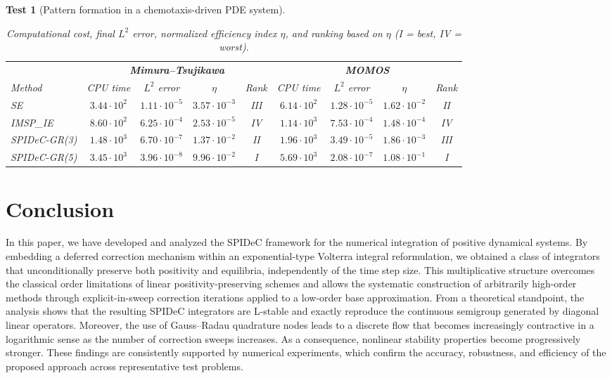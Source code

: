 \documentclass[a4paper,num-refs]{oup-contemporary-spidec}
\newtheorem{testcase}{Test} %
\begin{document}
\begin{testcase}[Pattern formation in a chemotaxis-driven PDE system]
\begin{table}[htb]
\centering
\caption{Computational cost, final $L^2$ error, normalized efficiency index $\eta$, and ranking based on $\eta$ (I = best, IV = worst).}
\label{tab:efficiency_rank}
\scriptsize
\setlength{\tabcolsep}{5pt}
\begin{tabular}{lcccc|cccc}
\toprule
& \multicolumn{4}{c|}{\textbf{Mimura--Tsujikawa}} & \multicolumn{4}{c}{\textbf{MOMOS}} \\
\cmidrule(lr){2-5} \cmidrule(lr){6-9}
Method & CPU time & $L^2$ error & $\eta$ & Rank
        & CPU time & $L^2$ error & $\eta$ & Rank \\
\midrule
SE
& $3.44\cdot10^{2}$ & $1.11\cdot10^{-5}$ & $3.57\cdot10^{-3}$ & III
& $6.14\cdot10^{2}$ & $1.28\cdot10^{-5}$ & $1.62\cdot10^{-2}$ & II \\
IMSP\_IE
& $8.60\cdot10^{2}$ & $6.25\cdot10^{-4}$ & $2.53\cdot10^{-5}$ & IV
& $1.14\cdot10^{3}$ & $7.53\cdot10^{-4}$ & $1.48\cdot10^{-4}$ & IV \\
SPIDeC-GR(3)
& $1.48\cdot10^{3}$ & $6.70\cdot10^{-7}$ & $1.37\cdot10^{-2}$ & II
& $1.96\cdot10^{3}$ & $3.49\cdot10^{-5}$ & $1.86\cdot10^{-3}$ & III \\
SPIDeC-GR(5)
& $3.45\cdot10^{3}$ & $3.96\cdot10^{-8}$ & $9.96\cdot10^{-2}$ & I
& $5.69\cdot10^{3}$ & $2.08\cdot10^{-7}$ & $1.08\cdot10^{-1}$ & I \\
\bottomrule
\end{tabular}
\end{table}

\end{testcase}
 
\section{Conclusion}\label{sec:Conclusion}

In this paper, we have developed and analyzed the SPIDeC framework for the numerical integration of positive dynamical systems. By embedding a deferred correction mechanism within an exponential-type Volterra integral reformulation, we obtained a class of integrators that unconditionally preserve both positivity and equilibria, independently of the time step size. This multiplicative structure overcomes the classical order limitations of linear positivity-preserving schemes and allows the systematic construction of arbitrarily high-order methods through explicit-in-sweep correction iterations applied to a low-order base approximation. From a theoretical standpoint, the analysis shows that the resulting SPIDeC integrators are L-stable and exactly reproduce the continuous semigroup generated by diagonal linear operators. Moreover, the use of Gauss–Radau quadrature nodes leads to a discrete flow that becomes increasingly contractive in a logarithmic sense as the number of correction sweeps increases. As a consequence, nonlinear stability properties become progressively stronger. These findings are consistently supported by numerical experiments, which confirm the accuracy, robustness, and efficiency of the proposed approach across representative test problems.
\end{document}
